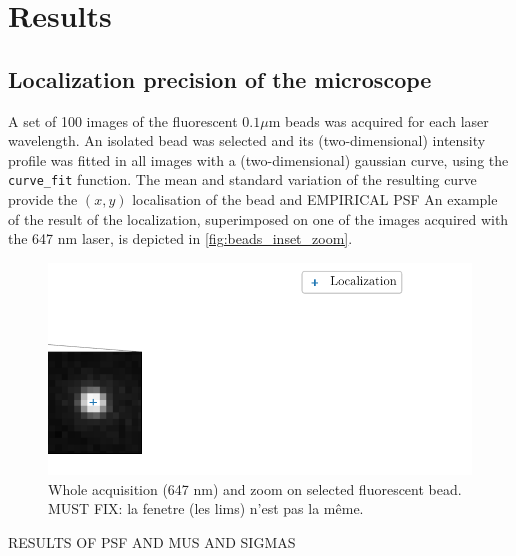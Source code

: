 \section{Results}
\subsection{Localization precision of the microscope}
A set of 100 images of the fluorescent $0.1 \mu$m beads was acquired for each laser wavelength.
An isolated bead was selected and its (two-dimensional) intensity profile was fitted in all images with a (two-dimensional) gaussian curve, using the \verb|curve_fit|  function. 
The mean and standard variation of the resulting curve provide the $(x,y)$ localisation of the bead and EMPIRICAL PSF
An example of the result of the localization, superimposed on one of the images acquired with the 647 nm laser, is depicted in \autoref{fig:beads_inset_zoom}. 

\begin{figure}[htbp]
    \centering
    \includegraphics[scale=1]{figures/beads_inset_zoom.pdf}
    \caption{Whole acquisition (647 nm) and zoom on selected fluorescent bead. MUST FIX: la fenetre (les lims) n'est pas la même.}
    \label{fig:beads_inset_zoom}
\end{figure}

RESULTS OF PSF AND MUS AND SIGMAS

